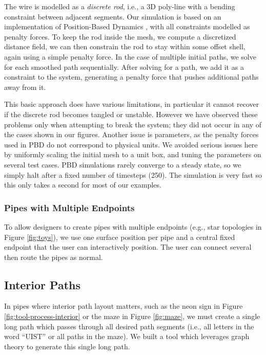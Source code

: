 The wire is modelled as a \emph{discrete rod}, i.e., a 3D poly-line with a bending 
constraint between adjacent segments. Our simulation is based on an
implementation of Position-Based Dynamics \cite{Muller07}, with all constraints
modelled as penalty forces. To keep the rod inside the
mesh, we compute a discretized distance field, we can then constrain the
rod to stay within some offset shell, again using a simple penalty force.
In the case of multiple initial paths, we solve for each smoothed path sequentially.
After solving for a path, we add it as a constraint to the system, generating
a penalty force that pushes additional paths away from it.

This basic approach does have various limitations, in particular it
cannot recover if the discrete rod becomes tangled or unstable. 
However we have observed these problems only when attempting to break
the system; they did not occur in any of the cases shown in our figures.
Another issue is parameters, as the penalty forces used in PBD do not
correspond to physical units. We avoided serious issues here by uniformly
scaling the initial mesh to a unit box, and tuning the parameters on several test cases.
PBD simulations rarely converge to a steady state, 
so we simply halt after a fixed number of timesteps (250). 
The simulation is very fast so this only takes a second for most of our examples.


\subsubsection{Pipes with Multiple Endpoints}
To allow designers to create pipes with multiple endpoints (e.g., star topologies in Figure \ref{fig:toys}), we use one surface position per pipe and a central fixed endpoint that the user can interactively position.  The user can connect several  then route the pipes as normal.

\subsection{Interior Paths}

In pipes where interior path layout matters, such as the neon sign in Figure \ref{fig:tool-process-interior} or the maze in Figure \ref{fig:maze}, we must create a single long path which passes through all desired path segments (i.e., all letters in the word ``UIST'' or all paths in the maze).  We built a tool which leverages graph theory to generate this single long path.


